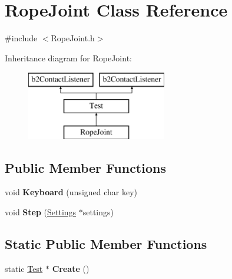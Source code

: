 \hypertarget{class_rope_joint}{\section{Rope\-Joint Class Reference}
\label{class_rope_joint}
}


{\ttfamily \#include $<$Rope\-Joint.\-h$>$}

Inheritance diagram for Rope\-Joint\-:\begin{figure}[H]
\begin{center}
\leavevmode
\includegraphics[height=3.000000cm]{class_rope_joint}
\end{center}
\end{figure}
\subsection*{Public Member Functions}
\begin{DoxyCompactItemize}
\item 
\hypertarget{class_rope_joint_a5dc03da5f7bd34bf60d3b62ff544e6c0}{void {\bfseries Keyboard} (unsigned char key)}\label{class_rope_joint_a5dc03da5f7bd34bf60d3b62ff544e6c0}

\item 
\hypertarget{class_rope_joint_ab16e28d5730775bfaa9d6aaa84b6cf8f}{void {\bfseries Step} (\hyperlink{struct_settings}{Settings} $\ast$settings)}\label{class_rope_joint_ab16e28d5730775bfaa9d6aaa84b6cf8f}

\end{DoxyCompactItemize}
\subsection*{Static Public Member Functions}
\begin{DoxyCompactItemize}
\item 
\hypertarget{class_rope_joint_a3effe2215e93188eb503b931d155eb90}{static \hyperlink{class_test}{Test} $\ast$ {\bfseries Create} ()}\label{class_rope_joint_a3effe2215e93188eb503b931d155eb90}

\end{DoxyCompactItemize}
